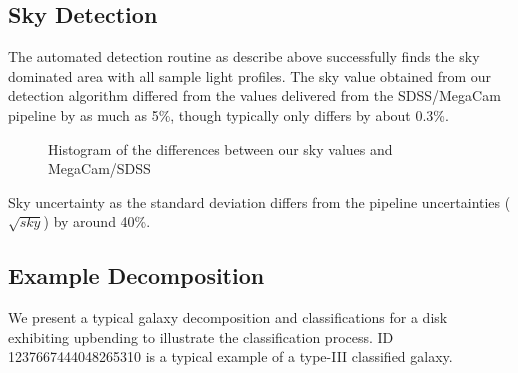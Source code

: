 


\subsection{Sky Detection} %
\label{sub:sky_detection}
The automated detection routine as describe above successfully finds the sky dominated area with all sample light profiles. The sky value obtained from our detection algorithm differed from the values delivered from the SDSS/MegaCam pipeline by as much as 5\%, though typically only differs by about 0.3\%. 
\begin{figure}[h]
	\centering
	\caption{Histogram of the differences between our sky values and MegaCam/SDSS}
\end{figure}
Sky uncertainty as the standard deviation differs from the pipeline uncertainties ($\sqrt{sky}$) by around 40\%. 



\subsection{Example Decomposition} %
\label{sub:example_decompositions}
We present a typical galaxy decomposition and classifications for a disk exhibiting upbending to illustrate the classification process. ID 1237667444048265310 is a typical example of a type-III classified galaxy.

